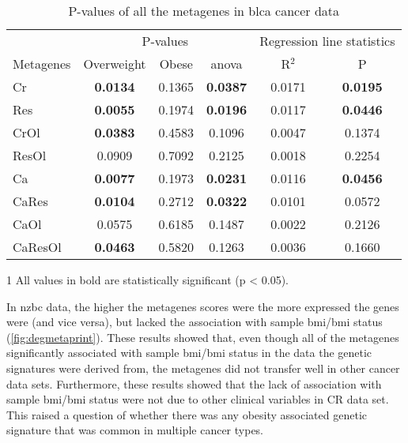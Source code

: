 \begin{table}[htpb]
	\centering
	\caption{P-values of all the metagenes in \gls{blca} cancer data}
	\label{tab:degmetablca}
	\begin{threeparttable}
		\begin{tabular}{lccccc}
			& \multicolumn{3}{c}{ P-values} & \multicolumn{2}{c}{ Regression line statistics}\\
			\cmidrule(r){2-4} \cmidrule(r){5-6}
			 Metagenes &  Overweight &  Obese &  \gls{anova} &  R$^2$ &  P \\
			\hline
			\hline
			\rule{0pt}{2.25ex}Cr & {\bfseries 0.0134}\tnote{1} & 0.1365 & {\bfseries 0.0387} & 0.0171 & {\bfseries 0.0195} \\
			Res                  & {\bfseries 0.0055}          & 0.1974 & {\bfseries 0.0196} & 0.0117 & {\bfseries 0.0446} \\
			CrOl                 & {\bfseries 0.0383}          & 0.4583 & 0.1096             & 0.0047 & 0.1374             \\
			ResOl                & 0.0909                      & 0.7092 & 0.2125             & 0.0018 & 0.2254             \\
			Ca                   & {\bfseries 0.0077}          & 0.1973 & {\bfseries 0.0231} & 0.0116 & {\bfseries 0.0456} \\
			CaRes                & {\bfseries 0.0104}          & 0.2712 & {\bfseries 0.0322} & 0.0101 & 0.0572             \\
			CaOl                 & 0.0575                      & 0.6185 & 0.1487             & 0.0022 & 0.2126             \\
			CaResOl              & {\bfseries 0.0463}          & 0.5820 & 0.1263             & 0.0036 & 0.1660             \\
			\hline
			\hline
		\end{tabular}
		\begin{tablenotes}
			\item [1] All values in bold are statistically significant (p \textless{} 0.05).
		\end{tablenotes}
	\end{threeparttable}
\end{table}

In \gls{nzbc} data, the higher the metagenes scores were the more expressed the genes were (and vice versa), but lacked the association with sample \gls{bmi}/\gls{bmi} status (\cref{fig:degmetaprint}).
These results showed that, even though all of the metagenes significantly associated with sample \gls{bmi}/\gls{bmi} status in the data the genetic signatures were derived from, the metagenes did not transfer well in other cancer data sets.
Furthermore, these results showed that the lack of association with sample \gls{bmi}/\gls{bmi} status were not due to other clinical variables in CR data set.
This raised a question of whether there was any obesity associated genetic signature that was common in multiple cancer types.

